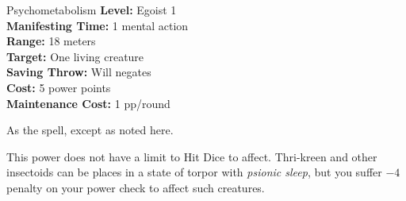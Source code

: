 {Psychometabolism}
{
	\textbf{Level:}
	Egoist 1\\
	\textbf{Manifesting Time:}
	1 mental action\\
	\textbf{Range:}
	18 meters\\
	\textbf{Target:}
	One living creature\\
	\textbf{Saving Throw:}
	Will negates\\
	\textbf{Cost:}
	5 power points\\
	\textbf{Maintenance Cost:}
	1 pp/round\\
}
{
	As the  spell, except as noted here.

	This power does not have a limit to Hit Dice to affect. Thri-kreen and other insectoids can be places in a state of torpor with \emph{psionic sleep}, but you suffer $-4$ penalty on your power check to affect such creatures.
}